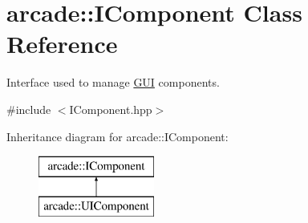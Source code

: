 \hypertarget{classarcade_1_1_i_component}{}\section{arcade\+:\+:I\+Component Class Reference}
\label{classarcade_1_1_i_component}


Interface used to manage \hyperlink{classarcade_1_1_g_u_i}{G\+UI} components.  




{\ttfamily \#include $<$I\+Component.\+hpp$>$}

Inheritance diagram for arcade\+:\+:I\+Component\+:\begin{figure}[H]
\begin{center}
\leavevmode
\includegraphics[height=2.000000cm]{classarcade_1_1_i_component}
\end{center}
\end{figure}
